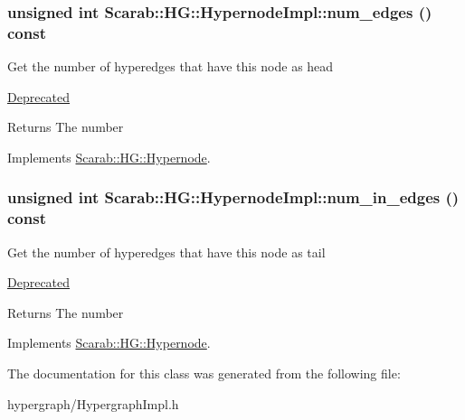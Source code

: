 \hypertarget{classScarab_1_1HG_1_1HypernodeImpl_a7fed4809706319cc916ed4c04a641436}{
\subsubsection[{num\_\-edges}]{\setlength{\rightskip}{0pt plus 5cm}unsigned int Scarab::HG::HypernodeImpl::num\_\-edges () const}}
\label{classScarab_1_1HG_1_1HypernodeImpl_a7fed4809706319cc916ed4c04a641436}
Get the number of hyperedges that have this node as head \begin{Desc}
\item[\hyperlink{deprecated__deprecated000007}{Deprecated}]\end{Desc}
\begin{DoxyReturn}{Returns}
The number 
\end{DoxyReturn}


Implements \hyperlink{classScarab_1_1HG_1_1Hypernode_add2f4d556be223b906bfbab9f1b60870}{Scarab::HG::Hypernode}.

\hypertarget{classScarab_1_1HG_1_1HypernodeImpl_a9a13a37fcece16603ec4bf3f364e6fcc}{
\subsubsection[{num\_\-in\_\-edges}]{\setlength{\rightskip}{0pt plus 5cm}unsigned int Scarab::HG::HypernodeImpl::num\_\-in\_\-edges () const}}
\label{classScarab_1_1HG_1_1HypernodeImpl_a9a13a37fcece16603ec4bf3f364e6fcc}
Get the number of hyperedges that have this node as tail \begin{Desc}
\item[\hyperlink{deprecated__deprecated000008}{Deprecated}]\end{Desc}
\begin{DoxyReturn}{Returns}
The number 
\end{DoxyReturn}


Implements \hyperlink{classScarab_1_1HG_1_1Hypernode_a4b1a4ffaa8a8b0295763673e6d86d693}{Scarab::HG::Hypernode}.



The documentation for this class was generated from the following file:\begin{DoxyCompactItemize}
\item 
hypergraph/HypergraphImpl.h\end{DoxyCompactItemize}
